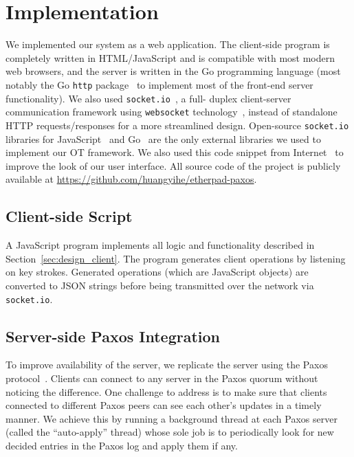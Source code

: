 \section{Implementation}

We implemented our system as a web application. The client-side program is
completely written in HTML/JavaScript and is compatible with most modern web
browsers, and the server is written in the Go programming language (most notably
the Go {\tt http} package~\cite{gohttp} to implement most of the front-end
server functionality). We also used {\tt socket.io}~\cite{socketio}, a full-
duplex client-server communication framework using {\tt websocket}
technology~\cite{websock}, instead of standalone HTTP requests/responses for a
more streamlined design. Open-source {\tt socket.io} libraries for
JavaScript~\cite{jssocketio} and Go~\cite{gosocketio} are the only external
libraries we used to implement our OT framework. We also used this code snippet
from Internet~\cite{linenumber} to improve the look of our user interface. All
source code of the project is publicly available at
\url{https://github.com/huangyihe/etherpad-paxos}.

\subsection{Client-side Script}

A JavaScript program implements all logic and functionality described in
Section~\ref{sec:design_client}. The program generates client operations by
listening on key strokes. Generated operations (which are JavaScript objects)
are converted to JSON strings before being transmitted over the network via {\tt
socket.io}.

\subsection{Server-side Paxos Integration}

To improve availability of the server, we replicate the server using the Paxos
protocol~\cite{lamport1998part}. Clients can connect to any server in the Paxos
quorum without noticing the difference. One challenge to address is to make sure
that clients connected to different Paxos peers can see each other's updates in
a timely manner. We achieve this by running a background thread at each Paxos
server (called the ``auto-apply'' thread) whose sole job is to periodically look
for new decided entries in the Paxos log and apply them if any.
